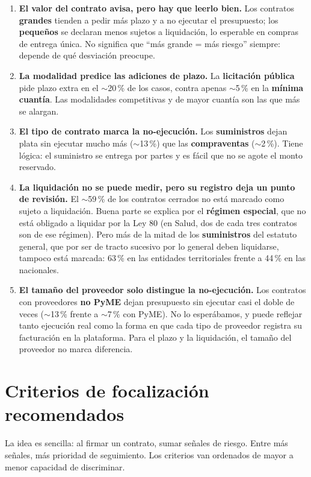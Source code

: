 \documentclass[11pt,a4paper]{article}
\newcommand{\apx}{\ensuremath{\sim}}                     %
\begin{document}
\begin{enumerate}
  \item \textbf{El valor del contrato avisa, pero hay que leerlo bien.} Los contratos \textbf{grandes} tienden a
    pedir más plazo y a no ejecutar el presupuesto; los \textbf{pequeños} se declaran menos sujetos a liquidación, lo esperable en compras de entrega
    única. No significa
    que \enquote{más grande = más riesgo} siempre: depende de qué desviación preocupe.
  \item \textbf{La modalidad predice las adiciones de plazo.} La \textbf{licitación pública} pide plazo extra en
    el \apx20\,\% de los casos, contra apenas \apx5\,\% en la \textbf{mínima cuantía}. Las modalidades
    competitivas y de mayor cuantía son las que más se alargan.
  \item \textbf{El tipo de contrato marca la no-ejecución.} Los \textbf{suministros} dejan plata sin ejecutar
    mucho más (\apx13\,\%) que las \textbf{compraventas} (\apx2\,\%). Tiene lógica: el suministro se entrega por
    partes y es fácil que no se agote el monto reservado.
  \item \textbf{La liquidación no se puede medir, pero su registro deja un punto de revisión.} El \apx59\,\% de
    los contratos cerrados no está marcado como sujeto a liquidación. Buena parte se explica por el
    \textbf{régimen especial}, que no está obligado a liquidar por la Ley 80 (en Salud, dos de cada tres contratos
    son de ese régimen). Pero más de la mitad de los \textbf{suministros} del estatuto general, que por ser de
    tracto sucesivo por lo general deben liquidarse, tampoco está marcada: 63\,\% en las entidades territoriales
    frente a 44\,\% en las nacionales.
  \item \textbf{El tamaño del proveedor solo distingue la no-ejecución.} Los contratos con proveedores
    \textbf{no PyME} dejan presupuesto sin ejecutar casi el doble de veces (\apx13\,\% frente a \apx7\,\% con
    PyME). No lo esperábamos, y puede reflejar tanto ejecución real como la forma en que cada tipo de proveedor
    registra su facturación en la plataforma. Para el plazo y la liquidación, el tamaño del proveedor no marca
    diferencia.
\end{enumerate}

\section{Criterios de focalización recomendados}

La idea es sencilla: al firmar un contrato, sumar señales de riesgo. Entre más señales, más prioridad de
seguimiento. Los criterios van ordenados de mayor a menor capacidad de discriminar.
\end{document}
